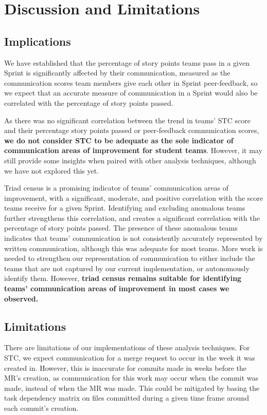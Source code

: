 \section{Discussion and Limitations}
\label{sec:discussion}
\subsection{Implications}
We have established that the percentage of story points teams pass in a given Sprint is significantly affected by their communication, measured as the communication scores team members give each other in Sprint peer-feedback, so we expect that an accurate measure of communication in a Sprint would also be correlated with the percentage of story points passed. 

As there was no significant correlation between the trend in teams' STC score and their percentage story points passed or peer-feedback communication scores, \textbf{we do not consider STC to be adequate as the sole indicator of communication areas of improvement for student teams}. However, it may still provide some insights when paired with other analysis techniques, although we have not explored this yet.  

Triad census is a promising indicator of teams' communication areas of improvement, with a significant, moderate, and positive correlation with the score teams receive for a given Sprint. Identifying and excluding anomalous teams further strengthens this correlation, and creates a significant correlation with the percentage of story points passed. The presence of these anomalous teams indicates that teams' communication is not consistently accurately represented by written communication, although this was adequate for most teams. More work is needed to strengthen our representation of communication to either include the teams that are not captured by our current implementation, or autonomously identify them. However, \textbf{triad census remains suitable for identifying teams' communication areas of improvement in most cases we observed.}

\subsection{Limitations}
There are limitations of our implementations of these analysis techniques. For STC, we expect communication for a merge request to occur in the week it was created in. However, this is inaccurate for commits made in weeks before the MR's creation, as communication for this work may occur when the commit was made, instead of when the MR was made. This could be mitigated by basing the task dependency matrix on files committed during a given time frame around each commit's creation.

